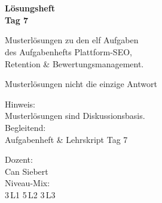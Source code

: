 \documentclass[11pt,a4paper,oneside]{article}
\begin{document}
\begin{titlepage}
  \pagestyle{empty}
  \vspace*{1.5cm}
  \\[2pt]
  \noindent{\color{lpAccent}\rule{\linewidth}{1.2pt}}\\[4pt]

  \vspace{3cm}
  {\sffamily\fontsize{30}{34}\selectfont\bfseries\color{lpInk}Lösungsheft\\Tag 7\par}

  \vspace{0.7cm}
  {\sffamily\large\color{lpGray}Musterlösungen zu den elf Aufgaben\\des Aufgabenhefts \textendash{} Plattform-SEO,\\Retention \& Bewertungsmanagement.\par}

  \vspace{1.5cm}
  {\caveatfont\LARGE\color{lpGreen}Musterlösungen \textperiodcentered{} nicht die einzige Antwort}\par

  \vfill

  \noindent\begin{minipage}{0.55\linewidth}
    {\sffamily\footnotesize\color{lpGray}Hinweis:}\\
    {\sffamily\small\color{lpInk}Musterlösungen sind Diskussionsbasis.}\\[10pt]
    {\sffamily\footnotesize\color{lpGray}Begleitend:}\\
    {\sffamily\small\color{lpInk}Aufgabenheft \& Lehrskript Tag 7}
  \end{minipage}\hfill
  \begin{minipage}{0.4\linewidth}
    \raggedleft
    {\sffamily\footnotesize\color{lpGray}Dozent:}\\
    {\sffamily\small\color{lpInk}Can Siebert}\\[10pt]
    {\sffamily\footnotesize\color{lpGray}Niveau-Mix:}\\
    {\sffamily\small\color{lpInk}3\,L1 \textperiodcentered{} 5\,L2 \textperiodcentered{} 3\,L3}
  \end{minipage}

  \vspace{0.5cm}
  \noindent{\color{lpAccent}\rule{\linewidth}{0.6pt}}
\end{titlepage}
\end{document}
